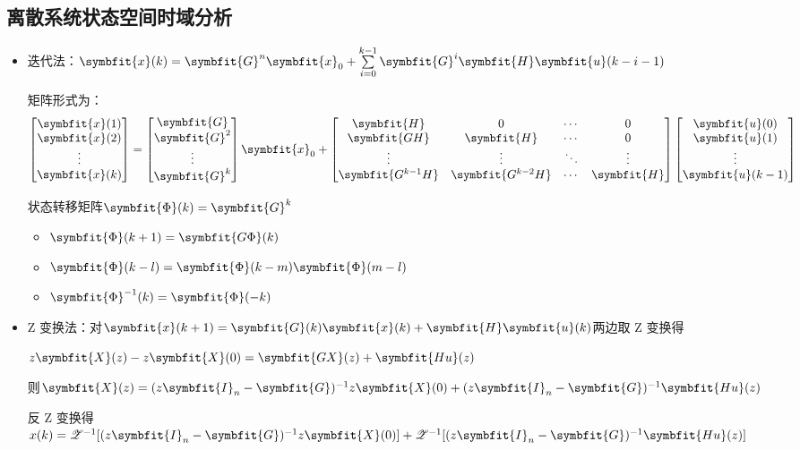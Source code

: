 \documentclass[11pt,a4paper]{ctexart}
\newcommand{\bm}{\symbfit}
\begin{document}
    \subsection{离散系统状态空间时域分析}
        \begin{itemize}
        \item 迭代法：$\bm{x}(k)=\bm{G}^n\bm{x}_0+\sum\limits_{i=0}^{k-1}\bm{G}^{i}\bm{H}\bm{u}(k-i-1)$
        
        矩阵形式为：
        \[
        \begin{bmatrix}\bm{x}(1)\\\bm{x}(2)\\\vdots\\\bm{x}(k)\end{bmatrix}=\begin{bmatrix}\bm{G}\\\bm{G}^2\\\vdots\\\bm{G}^k\end{bmatrix}\bm{x}_0+
        \begin{bmatrix}\bm{H} & 0 & \cdots & 0\\\bm{GH} & \bm{H} & \cdots & 0\\\vdots & \vdots & \ddots & \vdots\\\bm{G^{k-1}H} & \bm{G^{k-2}H} & \cdots & \bm{H}\end{bmatrix}\begin{bmatrix}\bm{u}(0)\\\bm{u}(1)\\\vdots\\\bm{u}(k-1)\end{bmatrix}
        \]

        状态转移矩阵$\bm{\Phi}(k)=\bm{G}^k$
        \begin{itemize}
            \item $\bm{\Phi}(k+1)=\bm{G\Phi}(k)$
            \item $\bm{\Phi}(k-l)=\bm{\Phi}(k-m)\bm{\Phi}(m-l)$
            \item $\bm{\Phi}^{-1}(k)=\bm{\Phi}(-k)$
        \end{itemize}
        \item Z 变换法：对$\bm{x}(k+1)=\bm{G}(k)\bm{x}(k)+\bm{H}\bm{u}(k)$两边取 Z 变换得
        
        $z\bm{X}(z)-z\bm{X}(0)=\bm{GX}(z)+\bm{Hu}(z)$
        
        则$\bm{X}(z)=(z\bm{I}_n-\bm{G})^{-1}z\bm{X}(0)+(z\bm{I}_n-\bm{G})^{-1}\bm{Hu}(z)$

        反 Z 变换得$x(k)=\mathscr{Z}^{-1}[(z\bm{I}_n-\bm{G})^{-1}z\bm{X}(0)]+\mathscr{Z}^{-1}[(z\bm{I}_n-\bm{G})^{-1}\bm{Hu}(z)]$
        \end{itemize}
\newpage
\end{document}
